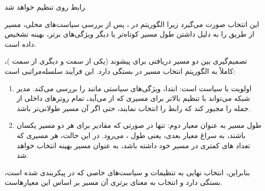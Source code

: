 

رابط روی \textbf{} تنظیم خواهد شد.


این انتخاب صورت می‌گیرد زیرا الگوریتم  در ، پس از بررسی سیاست‌های محلی، مسیر از طریق  را به دلیل داشتن طول مسیر  کوتاه‌تر یا دیگر ویژگی‌های برتر، بهینه تشخیص داده است.


تصمیم‌گیری بین دو مسیر دریافتی برای پیشوند  (یکی از سمت  و دیگری از سمت )، کاملاً به {الگوریتم انتخاب مسیر } در  بستگی دارد. این فرآیند سلسله‌مراتبی است:

\begin{enumerate}
	\item {اولویت با سیاست است:} ابتدا،  ویژگی‌های سیاستی مانند {} را بررسی می‌کند. مدیر شبکه  می‌تواند با تنظیم  بالاتر برای مسیری که از  می‌آید، تمام روترهای داخلی از جمله  را مجبور کند که رابط  را انتخاب نمایند، حتی اگر آن مسیر طولانی‌تر باشد.
	
	\item {طول مسیر به عنوان معیار دوم:} تنها در صورتی که مقادیر  برای هر دو مسیر یکسان باشند،  به سراغ معیار بعدی، یعنی طول {}، می‌رود. در این حالت، هر مسیری که تعداد های کمتری در مسیر خود داشته باشد، به عنوان مسیر بهینه انتخاب خواهد شد.
\end{enumerate}

بنابراین، انتخاب نهایی به تنظیمات و سیاست‌های خاصی که در  پیکربندی شده است، بستگی دارد و انتخاب  به معنای برتری آن مسیر بر اساس این معیارهاست.

